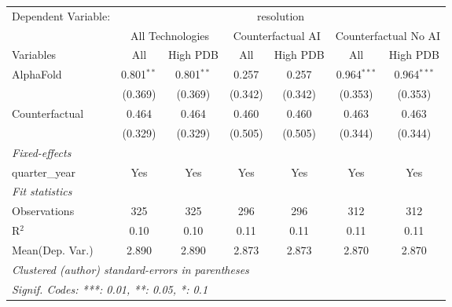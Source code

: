 \begingroup
\centering
\begin{tabular}{lcccccc}
   \tabularnewline \midrule \midrule
   Dependent Variable: & \multicolumn{6}{c}{resolution}\\
 & \multicolumn{2}{c}{All Technologies} & \multicolumn{2}{c}{Counterfactual AI} & \multicolumn{2}{c}{Counterfactual No AI} \\
\cmidrule(lr){1-1}\cmidrule(lr){2-3} \cmidrule(lr){4-5} \cmidrule(lr){6-7}
Variables & \multicolumn{1}{c}{All} & \multicolumn{1}{c}{High PDB} & \multicolumn{1}{c}{All} & \multicolumn{1}{c}{High PDB} & \multicolumn{1}{c}{All} & \multicolumn{1}{c}{High PDB} \\
\cmidrule(lr){1-1}\cmidrule(lr){2-2} \cmidrule(lr){3-3} \cmidrule(lr){4-4} \cmidrule(lr){5-5} \cmidrule(lr){6-6} \cmidrule(lr){7-7}
   AlphaFold      & 0.801$^{**}$ & 0.801$^{**}$ & 0.257   & 0.257   & 0.964$^{***}$ & 0.964$^{***}$\\   
                  & (0.369)      & (0.369)      & (0.342) & (0.342) & (0.353)       & (0.353)\\   
   Counterfactual & 0.464        & 0.464        & 0.460   & 0.460   & 0.463         & 0.463\\   
                  & (0.329)      & (0.329)      & (0.505) & (0.505) & (0.344)       & (0.344)\\   
   \midrule
   \emph{Fixed-effects}\\
   quarter\_year  & Yes          & Yes          & Yes     & Yes     & Yes           & Yes\\  
   \midrule
   \emph{Fit statistics}\\
   Observations   & 325          & 325          & 296     & 296     & 312           & 312\\  
   R$^2$          & 0.10         & 0.10         & 0.11    & 0.11    & 0.11          & 0.11\\  
Mean(Dep. Var.) & 2.890 & 2.890 & 2.873 & 2.873 & 2.870 & 2.870 \\
   \midrule \midrule
   \multicolumn{7}{l}{\emph{Clustered (author) standard-errors in parentheses}}\\
   \multicolumn{7}{l}{\emph{Signif. Codes: ***: 0.01, **: 0.05, *: 0.1}}\\
\end{tabular}
\par\endgroup

